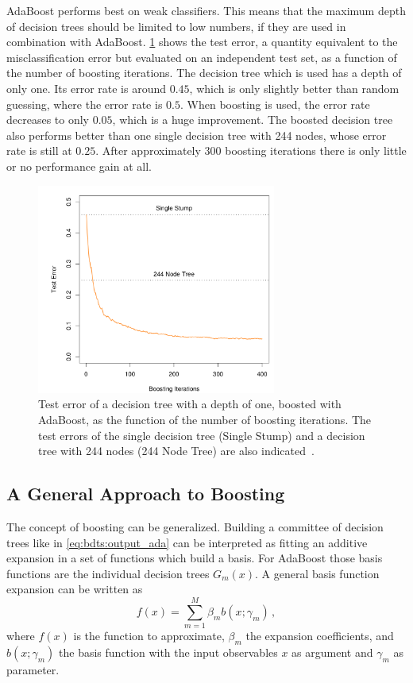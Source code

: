 AdaBoost performs best on weak classifiers.
This means that the maximum depth of decision trees should be limited to low numbers, if they are used in combination with
AdaBoost.
\cref{fig:bdt:adaboost_testerror} shows the test error, a quantity equivalent to the misclassification error but evaluated on
an independent test set, as a function of the number of boosting iterations.
The decision tree which is used has a depth of only one.
Its error rate is around $0.45$, which is only slightly better than random guessing, where the error rate is $0.5$.
When boosting is used, the error rate decreases to only $0.05$, which is a huge improvement.
The boosted decision tree also performs better than one single decision tree with 244 nodes, whose error rate is still at $0.25$.
After approximately 300 boosting iterations there is only little or no performance gain at all.

\begin{figure}[htb]
    \centering
    \includegraphics[width=0.7\textwidth]{./figures/bdts/adaboost_testerror.png}
    \caption{Test error of a decision tree with a depth of one, boosted with AdaBoost, as the function of the number of boosting iterations.
             The test errors of the single decision tree (Single Stump) and a decision tree with 244 nodes (244 Node Tree) are also indicated~\cite{Hastie2009}.}\label{fig:bdt:adaboost_testerror}
\end{figure}

\subsection{A General Approach to Boosting}\label{sub:bdt:boosting:general}

The concept of boosting can be generalized.
Building a committee of decision trees like in \cref{eq:bdts:output_ada} can be interpreted as
fitting an additive expansion in a set of functions which build a basis.
For AdaBoost those basis functions are the individual decision trees $G_m(x)$.
A general basis function expansion can be written as
\begin{equation}
    f(x) = \sum_{m=1}^M \beta_m b(x; \gamma_m) \,,
\end{equation}
where $f(x)$ is the function to approximate, $\beta_m$ the expansion coefficients, and $b(x; \gamma_m)$
the basis function with the input observables $x$ as argument and $\gamma_m$ as parameter.

